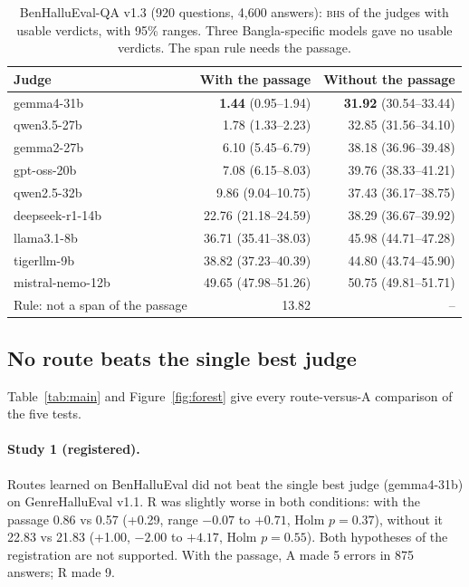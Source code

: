 \documentclass[11pt]{article}
\newcommand{\BHS}{\textsc{bhs}}
\begin{document}
\begin{table}[t]
\centering\small
\caption{BenHalluEval-QA v1.3 (920 questions, 4,600 answers): \BHS{} of the judges with usable verdicts, with 95\%
ranges. Three Bangla-specific models gave no usable verdicts. The span rule needs the passage.}\label{tab:judges}
\begin{tabular}{@{}lrr@{}}
\toprule
Judge & With the passage & Without the passage \\
\midrule
gemma4-31b & \textbf{1.44} (0.95--1.94) & \textbf{31.92} (30.54--33.44) \\
qwen3.5-27b & 1.78 (1.33--2.23) & 32.85 (31.56--34.10) \\
gemma2-27b & 6.10 (5.45--6.79) & 38.18 (36.96--39.48) \\
gpt-oss-20b & 7.08 (6.15--8.03) & 39.76 (38.33--41.21) \\
qwen2.5-32b & 9.86 (9.04--10.75) & 37.43 (36.17--38.75) \\
deepseek-r1-14b & 22.76 (21.18--24.59) & 38.29 (36.67--39.92) \\
llama3.1-8b & 36.71 (35.41--38.03) & 45.98 (44.71--47.28) \\
tigerllm-9b & 38.82 (37.23--40.39) & 44.80 (43.74--45.90) \\
mistral-nemo-12b & 49.65 (47.98--51.26) & 50.75 (49.81--51.71) \\
\midrule
Rule: not a span of the passage & 13.82 & -- \\
\bottomrule
\end{tabular}
\end{table}

\subsection{No route beats the single best judge}

Table~\ref{tab:main} and Figure~\ref{fig:forest} give every route-versus-A comparison of the five tests.

\paragraph{Study 1 (registered).} Routes learned on BenHalluEval did not beat the single best judge (gemma4-31b) on
GenreHalluEval v1.1. R was slightly worse in both conditions: with the passage 0.86 vs 0.57 (+0.29, range $-0.07$ to
$+0.71$, Holm $p=0.37$), without it 22.83 vs 21.83 (+1.00, $-2.00$ to $+4.17$, Holm $p=0.55$). Both hypotheses of the
registration are not supported. With the passage, A made 5 errors in 875 answers; R made 9.
\end{document}
